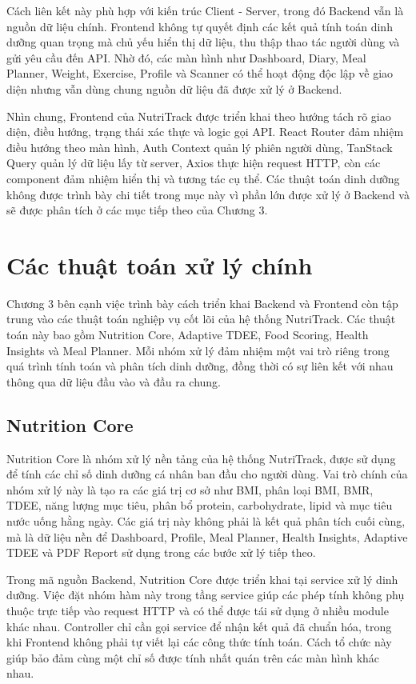 \documentclass[12pt, a4paper]{report}
\begin{document}
Cách liên kết này phù hợp với kiến trúc Client - Server, trong đó Backend vẫn là nguồn dữ liệu chính. Frontend không tự quyết định các kết quả tính toán dinh dưỡng quan trọng mà chủ yếu hiển thị dữ liệu, thu thập thao tác người dùng và gửi yêu cầu đến API. Nhờ đó, các màn hình như Dashboard, Diary, Meal Planner, Weight, Exercise, Profile và Scanner có thể hoạt động độc lập về giao diện nhưng vẫn dùng chung nguồn dữ liệu đã được xử lý ở Backend.

Nhìn chung, Frontend của NutriTrack được triển khai theo hướng tách rõ giao diện, điều hướng, trạng thái xác thực và logic gọi API. React Router đảm nhiệm điều hướng theo màn hình, Auth Context quản lý phiên người dùng, TanStack Query quản lý dữ liệu lấy từ server, Axios thực hiện request HTTP, còn các component đảm nhiệm hiển thị và tương tác cụ thể. Các thuật toán dinh dưỡng không được trình bày chi tiết trong mục này vì phần lớn được xử lý ở Backend và sẽ được phân tích ở các mục tiếp theo của Chương 3.

\section{Các thuật toán xử lý chính}Chương 3 bên cạnh việc trình bày cách triển khai Backend và Frontend còn tập trung vào các thuật toán nghiệp vụ cốt lõi của hệ thống NutriTrack. Các thuật toán này bao gồm Nutrition Core, Adaptive TDEE, Food Scoring, Health Insights và Meal Planner. Mỗi nhóm xử lý đảm nhiệm một vai trò riêng trong quá trình tính toán và phân tích dinh dưỡng, đồng thời có sự liên kết với nhau thông qua dữ liệu đầu vào và đầu ra chung.

\subsection{Nutrition Core}Nutrition Core là nhóm xử lý nền tảng của hệ thống NutriTrack, được sử dụng để tính các chỉ số dinh dưỡng cá nhân ban đầu cho người dùng. Vai trò chính của nhóm xử lý này là tạo ra các giá trị cơ sở như BMI, phân loại BMI, BMR, TDEE, năng lượng mục tiêu, phân bổ protein, carbohydrate, lipid và mục tiêu nước uống hằng ngày. Các giá trị này không phải là kết quả phân tích cuối cùng, mà là dữ liệu nền để Dashboard, Profile, Meal Planner, Health Insights, Adaptive TDEE và PDF Report sử dụng trong các bước xử lý tiếp theo.

Trong mã nguồn Backend, Nutrition Core được triển khai tại service xử lý dinh dưỡng. Việc đặt nhóm hàm này trong tầng service giúp các phép tính không phụ thuộc trực tiếp vào request HTTP và có thể được tái sử dụng ở nhiều module khác nhau. Controller chỉ cần gọi service để nhận kết quả đã chuẩn hóa, trong khi Frontend không phải tự viết lại các công thức tính toán. Cách tổ chức này giúp bảo đảm cùng một chỉ số được tính nhất quán trên các màn hình khác nhau.
\end{document}

